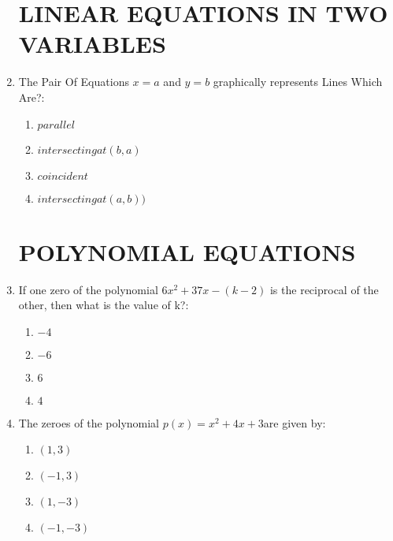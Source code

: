 \documentclass[12pt-letter paper]{article}
\providecommand{\brak}[1]{\ensuremath{\left(#1\right)}}
\begin{document}
\begin{enumerate}
\begin{center}
\section*{LINEAR EQUATIONS IN TWO VARIABLES}        
\end{center}
\item The Pair Of Equations $x=a$ and $y=b$ graphically represents Lines Which Are?:    
\begin{enumerate}
\item $ parallel $                                  
\item $ intersecting at \brak{b,a} $                                
\item $ coincident $    
\item $ intersecting at \brak{a,b}) $
\end{enumerate}                                    
\begin{center}                                    
\section*{POLYNOMIAL EQUATIONS}        
\end{center}
\item If one zero of the polynomial $6x^2 + 37x - \brak{k-2}$ is the reciprocal of the other,
then what is the value of k?:      
\begin{enumerate}
\item $ -4 $          
\item $ -6 $
\item $ 6 $                                          
\item $ 4 $
\end{enumerate}
\item The zeroes of the polynomial $p\brak{x} = x ^ 2 + 4x + 3$are given by:
\begin{enumerate}                        
\item $ \brak{1,3} $                            
\item $ \brak{-1,3} $                
\item $ \brak{1,-3} $
\item $ \brak{-1,-3} $                                
\end{enumerate}                                        
\begin{center}                                    

\end{center}
\end{enumerate}
\end{document}
